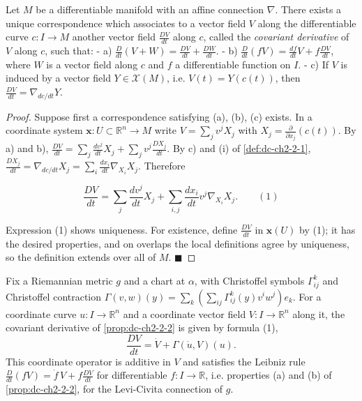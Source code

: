 \begin{proposition}
  \label{prop:dc-ch2-2-2}
  \leanok
  Let $M$ be a differentiable manifold with an affine connection $\nabla$. There
  exists a unique correspondence which associates to a vector field $V$ along the
  differentiable curve $c:I\to M$ another vector field $\frac{DV}{dt}$ along $c$,
  called the \emph{covariant derivative} of $V$ along $c$, such that:
  - a) $\frac{D}{dt}(V+W)=\frac{DV}{dt}+\frac{DW}{dt}$.
  - b) $\frac{D}{dt}(fV)=\frac{df}{dt}V+f\frac{DV}{dt}$, where $W$ is a vector field along $c$ and $f$ a differentiable function on $I$.
  - c) If $V$ is induced by a vector field $Y\in\mathcal{X}(M)$, i.e. $V(t)=Y(c(t))$, then $\frac{DV}{dt}=\nabla_{dc/dt}Y$.
\end{proposition}
\begin{proof}
  \leanok
  Suppose first a correspondence satisfying (a), (b), (c) exists. In a
  coordinate system $\mathbf{x}:U\subset\mathbb{R}^n\to M$ write $V=\sum_j v^j X_j$
  with $X_j=\frac{\partial}{\partial x_j}(c(t))$. By a) and b),
  $\frac{DV}{dt}=\sum_j \frac{dv^j}{dt}X_j+\sum_j v^j\frac{DX_j}{dt}$. By c) and (i)
  of \cref{def:dc-ch2-2-1}, $\frac{DX_j}{dt}=\nabla_{dc/dt}X_j=\sum_i\frac{dx_i}{dt}\nabla_{X_i}X_j$.
  Therefore
  
  $$
  \frac{DV}{dt}=\sum_j\frac{dv^j}{dt}X_j+\sum_{i,j}\frac{dx_i}{dt}v^j\nabla_{X_i}X_j.\qquad(1)
  $$
  
  Expression (1) shows uniqueness. For existence, define $\frac{DV}{dt}$ in
  $\mathbf{x}(U)$ by (1); it has the desired properties, and on overlaps the local
  definitions agree by uniqueness, so the definition extends over all of $M$.
  $\blacksquare$
\end{proof}

\begin{lemma}
  \label{lem:dc-ch2-2-2-coord}
  \leanok
  Fix a Riemannian metric $g$ and a chart at $\alpha$, with Christoffel symbols
  $\Gamma^k_{ij}$ and Christoffel contraction $\Gamma(v,w)(y)=\sum_k(\sum_{ij}\Gamma^k_{ij}(y)v^iw^j)e_k$.
  For a coordinate curve $u:I\to\mathbb{R}^n$ and a coordinate vector field
  $V:I\to\mathbb{R}^n$ along it, the covariant derivative of
  \cref{prop:dc-ch2-2-2} is given by formula (1),
  $$\frac{DV}{dt}=\dot V+\Gamma(\dot u,V)(u).$$
  This coordinate operator is additive in $V$ and satisfies the Leibniz rule
  $\frac{D}{dt}(fV)=\dot f\,V+f\frac{DV}{dt}$ for differentiable $f:I\to\mathbb{R}$,
  i.e. properties (a) and (b) of \cref{prop:dc-ch2-2-2}, for the Levi-Civita
  connection of $g$.
\end{lemma}

